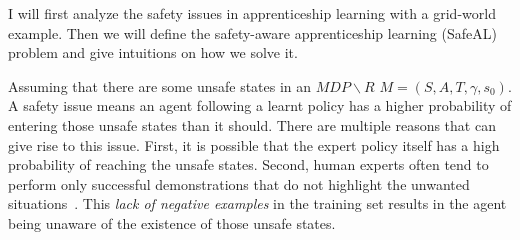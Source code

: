 I will first analyze the safety issues in apprenticeship learning with a grid-world example. Then we will define the safety-aware apprenticeship learning (SafeAL) problem and give intuitions on how we solve it. 


 

Assuming that there are some unsafe states
in an $MDP\backslash R$ $M = (S, A, T, \gamma, s_0)$. 
A safety issue means an agent following a learnt policy has a higher probability of entering those unsafe states than it should. There are multiple reasons that can give rise to this issue. First, it is possible that the expert policy itself has a high probability of reaching the unsafe states. Second, human experts often tend to perform only successful demonstrations that do not highlight the unwanted situations~\cite{shiarlis2016inverse}. This {\it lack of negative examples} in the training set results in the agent being unaware of the existence of those unsafe states.

